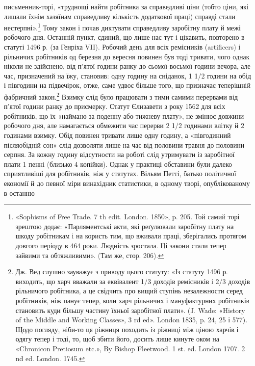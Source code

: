\parcont{}  %
письменник-торі, «труднощі найти робітника за справедливі
ціни (тобто ціни, які лишали їхнім хазяїнам справедливу кількість
додаткової праці) справді стали нестерпні».\footnote{
«Sophisms of Free Trade. 7 th edit. London. 1850», p. 205. Той
самий торі зрештою додає: «Парляментські акти, які реґулювали заробітну
плату на шкоду робітникам і на користь тим, що вживали праці,
зберігались протягом довгого періоду в 464 роки. Людність зростала.
Ці закони стали тепер зайвими та обтяжливими». (Там же, стор. 206).
} Тому закон і
почав диктувати справедливу заробітну плату й межі робочого
дня. Останній пункт, єдиний, що лише нас тут і цікавить, повторено
в статуті 1496 р. (за Генріха VII). Робочий день для всіх
ремісників (artificers) і рільничих робітників од березня до вересня
повинен був тоді тривати, чого однак ніколи не здійснено,
від п’ятої години ранку до сьомої-восьмої години вечора,
але час, призначений на їжу, становив: одну годину на сніданок,
1 1/2 години на обід і півгодини на підвечірок, отже, саме
удвоє більше того, що призначає теперішній фабричний закон.\footnote{
Дж. Вед слушно зауважує з приводу цього статуту: «Із статуту
1496 р. виходить, що харч вважали за еквівалент 1/3 доходів ремісників
і 2/3 доходів рільничого робітника, а це свідчить про вищий ступінь незалежности
серед робітників, ніж панує тепер, коли харч рільничих і мануфактурних
робітників становить куди більшу частину їхньої заробітної
плати». (J. Wade: «History of the Middle and Working Classes», 3 rd
ed». London 1835, p. 24, 25 і 577). Щодо погляду, ніби-то ця ріжниця
походить із ріжниці між ціною харчів і одягу тепер і тоді, то, щоб збити
його, досить лише кинуте оком на «Chronicon Pretiosum etc.», By Bishop
Fleetwood. 1 st. ed. London 1707. 2 nd ed. London. 1745.
}
Взимку слід було працювати з тими самими перервами від п’ятої
години ранку до присмерку. Статут Єлизавети з року 1562 для
всіх робітників, що їх «наймано за поденну або тижневу плату»,
не змінює довжини робочого дня, але намагається обмежити час
перерви 2 1/2 годинами влітку й 2 годинами взимку. Обід повинен
тривати лише одну годину, а «півгодинний післяобідній сон» слід
дозволяти лише на час від половини травня до половини серпня.
За кожну годину відсутности на роботі слід утримувати із заробітної
плати 1 пенні (близько 4 копійки). Однак у практиці обставини
були далеко сприятливіші для робітників, ніж у статутах.
Вільям Петті, батько політичної економії й до певної міри винахідник
статистики, в одному творі, опублікованому в останню
